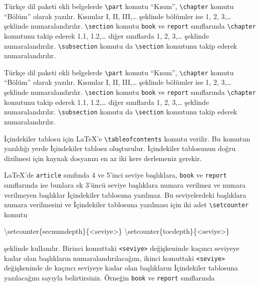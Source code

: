 \documentclass[
  10pt,
]{scrbook}
\newenvironment{Shaded}{}{}
\newcommand{\FunctionTok}[1]{\textcolor[rgb]{0.02,0.16,0.49}{#1}}
\newcommand{\NormalTok}[1]{#1}
\theoremstyle{definition}
\theoremstyle{definition}
\theoremstyle{definition}
\theoremstyle{definition}
\theoremstyle{remark}
\begin{document}
Türkçe dil paketi ekli belgelerde \texttt{\textbackslash{}part} komutu ``Kısım'', \texttt{\textbackslash{}chapter} komutu ``Bölüm'' olarak yazılır. Kısımlar I, II, III,\ldots{} şeklinde bölümler ise 1, 2, 3,\ldots{} şeklinde numaralandırılır. \texttt{\textbackslash{}section} komutu \texttt{book} ve \texttt{report} sınıflarında \texttt{\textbackslash{}chapter} komutunu takip ederek 1.1, 1.2,\ldots{} diğer sınıflarda 1, 2, 3,\ldots{} şeklinde numaralandırılır. \texttt{\textbackslash{}subsection} komutu da \texttt{\textbackslash{}section} komutunu takip ederek numaralandırılır.

Türkçe dil paketi ekli belgelerde \texttt{\textbackslash{}part} komutu ``Kısım'', \texttt{\textbackslash{}chapter} komutu ``Bölüm'' olarak yazılır. Kısımlar I, II, III,\ldots{} şeklinde bölümler ise 1, 2, 3,\ldots{} şeklinde numaralandırılır. \texttt{\textbackslash{}section} komutu \texttt{book} ve \texttt{report} sınıflarında \texttt{\textbackslash{}chapter} komutunu takip ederek 1.1, 1.2,\ldots{} diğer sınıflarda 1, 2, 3,\ldots{} şeklinde numaralandırılır. \texttt{\textbackslash{}subsection} komutu da \texttt{\textbackslash{}section} komutunu takip ederek numaralandırılır.

İçindekiler tablosu için LaTeX'e \texttt{\textbackslash{}tableofcontents} komutu verilir. Bu komutun yazıldığı yerde İçindekiler tablosu oluşturulur. İçindekiler tablosunun doğru dizilmesi için kaynak dosyanızı en az iki kere derlemeniz gerekir.

LaTeX'de \texttt{article} sınıfında 4 ve 5'inci seviye başlıklara, \texttt{book} ve \texttt{report} sınıflarında ise bunlara ek 3'üncü seviye başlıklara numara verilmez ve numara verilmeyen başlıklar İçindekiler tablosuna yazılmaz. Bu seviyelerdeki başlıklara numara verilmesini ve İçindekiler tablosuna yazılması için iki adet \texttt{\textbackslash{}setcounter} komutu

\begin{Shaded}
\begin{Highlighting}[]
\FunctionTok{\textbackslash{}setcounter}\NormalTok{\{secnumdepth\}\{\textless{}seviye\textgreater{}\}}
\FunctionTok{\textbackslash{}setcounter}\NormalTok{\{tocdepth\}\{\textless{}seviye\textgreater{}\}}
\end{Highlighting}
\end{Shaded}

şeklinde kullanılır. Birinci komuttaki \texttt{\textless{}seviye\textgreater{}} değişkeninde kaçıncı seviyeye kadar olan başlıkların numaralandırılacağını, ikinci komuttaki \texttt{\textless{}seviye\textgreater{}} değişkeninde de kaçıncı seviyeye kadar olan başlıkların İçindekiler tablosuna yazılacağını sayıyla belirtirsiniz. Örneğin \texttt{book} ve \texttt{report} sınıflarında
\end{document}
